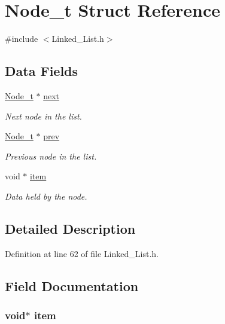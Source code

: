 \hypertarget{struct_node__t}{}\section{Node\+\_\+t Struct Reference}
\label{struct_node__t}


{\ttfamily \#include $<$Linked\+\_\+\+List.\+h$>$}

\subsection*{Data Fields}
\begin{DoxyCompactItemize}
\item 
\hyperlink{struct_node__t}{Node\+\_\+t} $\ast$ \hyperlink{struct_node__t_a249ab672b08b852bbcf27a16e05dacf5}{next}
\begin{DoxyCompactList}\small\item\em Next node in the list. \end{DoxyCompactList}\item 
\hyperlink{struct_node__t}{Node\+\_\+t} $\ast$ \hyperlink{struct_node__t_a05135d5188af738ba91fcf12461b0efb}{prev}
\begin{DoxyCompactList}\small\item\em Previous node in the list. \end{DoxyCompactList}\item 
void $\ast$ \hyperlink{struct_node__t_aeeeae972d4d97226aa998aa9ca91346c}{item}
\begin{DoxyCompactList}\small\item\em Data held by the node. \end{DoxyCompactList}\end{DoxyCompactItemize}


\subsection{Detailed Description}


Definition at line 62 of file Linked\+\_\+\+List.\+h.



\subsection{Field Documentation}
\hypertarget{struct_node__t_aeeeae972d4d97226aa998aa9ca91346c}{}
\subsubsection[{item}]{\setlength{\rightskip}{0pt plus 5cm}void$\ast$ item}\label{struct_node__t_aeeeae972d4d97226aa998aa9ca91346c}


